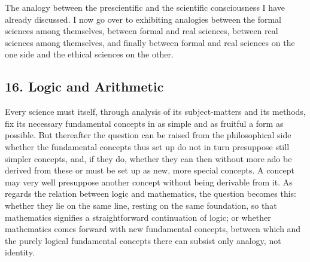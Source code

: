 \documentclass[12pt]{book}
\begin{document}
The analogy between the prescientific and the scientific consciousness I have
already discussed. I now go over to exhibiting analogies between the formal
sciences among themselves, between formal and real sciences, between real
sciences among themselves, and finally between formal and real sciences on the
one side and the ethical sciences on the other.

\subsection*{16. Logic and Arithmetic}

Every science must itself, through analysis of its subject-matters and its
methods, fix its necessary fundamental concepts in as simple and as fruitful a
form as possible. But thereafter the question can be raised from the
philosophical side whether the fundamental concepts thus set up do not in turn
presuppose still simpler concepts, and, if they do, whether they can then without
more ado be derived from these or must be set up as new, more special concepts. A
concept may very well presuppose another concept without being derivable from it.
As regards the relation between logic and mathematics, the question becomes this:
whether they lie on the same line, resting on the same foundation, so that
mathematics signifies a straightforward continuation of logic; or whether
mathematics comes forward with new fundamental concepts, between which and the
purely logical fundamental concepts there can subsist only analogy, not identity.
\end{document}
